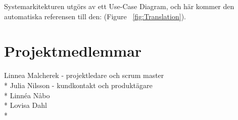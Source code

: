 \documentclass[11pt]{article} %
\begin{document}
Systemarkitekturen utgörs av ett Use-Case Diagram, och här kommer den automatiska referensen till den:   (Figure ~\ref{fig:Translation}).



\pagebreak


\section{Projektmedlemmar}

Linnea Malcherek - projektledare och scrum master\\*
Julia Nilsson - kundkontakt och produktägare\\*
Linnéa Nåbo \\*
Lovisa Dahl\\*
\end{document}
